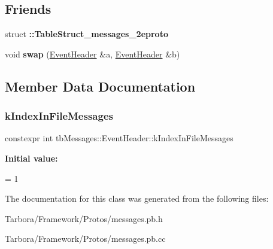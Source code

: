 \subsection*{Friends}
\begin{DoxyCompactItemize}
\item 
\mbox{\label{classtbMessages_1_1EventHeader_a6669c254757d8a4b2e1f51c0da62dd91}} 
struct {\bfseries \+::\+Table\+Struct\+\_\+messages\+\_\+2eproto}
\item 
\mbox{\label{classtbMessages_1_1EventHeader_acab06b4543eff02e693bc24fde842b89}} 
void {\bfseries swap} (\hyperlink{classtbMessages_1_1EventHeader}{Event\+Header} \&a, \hyperlink{classtbMessages_1_1EventHeader}{Event\+Header} \&b)
\end{DoxyCompactItemize}


\subsection{Member Data Documentation}
\mbox{\label{classtbMessages_1_1EventHeader_aff474cd410d29d094e15aff461a3a6bc}} 
\subsubsection{\texorpdfstring{k\+Index\+In\+File\+Messages}{kIndexInFileMessages}}
{\footnotesize\ttfamily constexpr int tb\+Messages\+::\+Event\+Header\+::k\+Index\+In\+File\+Messages\hspace{0.3cm}{\ttfamily [static]}}

{\bfseries Initial value\+:}
\begin{DoxyCode}
=
    1
\end{DoxyCode}


The documentation for this class was generated from the following files\+:\begin{DoxyCompactItemize}
\item 
Tarbora/\+Framework/\+Protos/messages.\+pb.\+h\item 
Tarbora/\+Framework/\+Protos/messages.\+pb.\+cc\end{DoxyCompactItemize}
